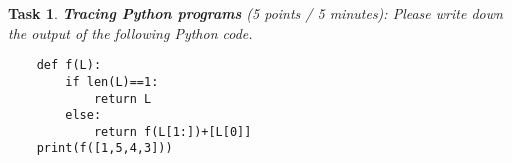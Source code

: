 \documentclass[UTF8]{ctexart}
\newtheorem{task}{Task}
\begin{document}
%
%
%

\newpage

\begin{task}
{\textbf{Tracing Python programs}} (5 points / 5 minutes): Please write down the output of the following Python code.
\end{task}
\begin{verbatim}
    def f(L):
        if len(L)==1:
            return L
        else:
            return f(L[1:])+[L[0]]
    print(f([1,5,4,3]))
\end{verbatim}
\end{document}
